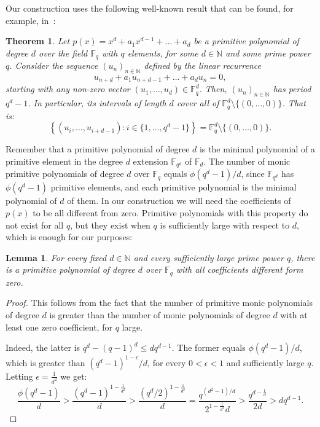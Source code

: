 \documentclass[12pt,a4paper]{article}
\newcommand{\F}{\mathbb F}
\newcommand{\N}{\mathbb N}
\theoremstyle{plain}
\newtheorem{theorem}{Theorem}
\newtheorem{lemma}{Lemma}
\theoremstyle{definition}
\begin{document}
Our construction uses the following well-known result that can be found, for example, in~\cite[Theorem 33.16]{LidlPilz}:

\begin{theorem}
\label{thm:sequence}
Let $p(x) = x^{d} + a_1 x^{d-1} +\dots+ a_d$ be a primitive polynomial of degree $d$ over the field $\F_q$ with $q$ elements, for some $d\in \N$ and some prime power $q$. Consider the sequence $(u_n)_{n\in \N}$ defined by the linear recurrence
\[
u_{n+d} + a_1 u_{n+d-1} +\dots+ a_d u_n =0,
\]
starting with any non-zero vector $(u_1, \dots,u_{d}) \in \F_q^d$. Then, $(u_n)_{n\in \N}$ has period $q^d-1$. In particular, its intervals of length $d$ cover all of $ \F_q^d\setminus \{(0,\dots,0)\}$. That is:
\[
\left\{(u_i,\dots,u_{i+d-1}) : i\in \{1,\dots, q^d-1\} \right\}= \F_q^d \setminus \{(0,\dots,0)\}.
\]
\end{theorem}

Remember that a primitive polynomial of degree $d$ is the minimal polynomial of a primitive element in the degree $d$ extension $\F_{q^d}$ of $\F_d$. The number of monic primitive polynomials of degree $d$ over $\F_q$ equals $\phi(q^d-1)/d$, since $\F_{q^d}$ has $\phi(q^d-1)$ primitive elements, and each primitive polynomial is the minimal polynomial of $d$ of them.
In our construction we will need the coefficients of $p(x)$ to be all different from zero. Primitive polynomials with this property do not exist for all $q$, but they exist when $q$ is sufficiently large with respect to $d$, which is enough for our purposes:

\begin{lemma}
  For every fixed $d\in\N$ and every sufficiently large prime power $q$, there is a primitive polynomial of degree $d$ over $\mathbb{F}_q$ with all coefficients different form zero.
\end{lemma}

\begin{proof}
This follows from the fact that the number of primitive monic polynomials of degree $d$ is greater than the number of monic polynomials of degree $d$ with at least one zero coefficient, for $q$ large. 

Indeed, the latter is $q^d-(q-1)^d\leq dq^{d-1}$. The former equals $\phi(q^d-1)/d$, which is greater than $(q^d-1)^{1-\epsilon}/d$, for every $0<\epsilon<1$ and sufficiently large $q$. Letting $\epsilon=\frac{1}{d^2}$ we get:
  \[
    \frac{\phi(q^d-1)}{d}>\frac{(q^d-1)^{1-\frac{1}{d^2}}}{d}>\frac{(q^d/2)^{1-\frac{1}{d^2}}}{d}=\frac{q^{(d^2-1)/d}}{2^{1-\frac{1}{d^2}}d}>\frac{q^{d-\frac{1}{d}}}{2d} >dq^{d-1}.
  \]
\end{proof}
\end{document}
